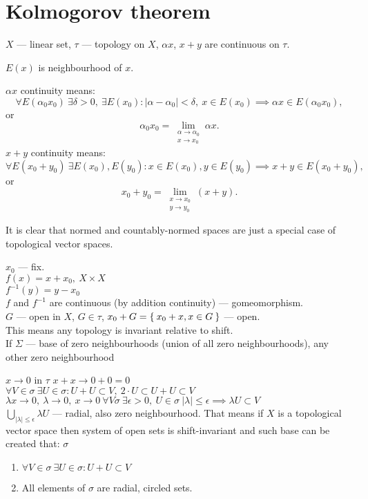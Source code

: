 \section{Kolmogorov theorem}
\begin{defn}
  $X$ --- linear set, $\tau$ --- topology on $X$, $\alpha x$, $x + y$ are
  continuous on $\tau$.

  \noindent $E(x)$ is neighbourhood of $x$.
  
  \noindent $\alpha x$ continuity means:
  \[
    \forall E(\alpha_0 x_0)\ \exists \delta > 0,\ \exists E(x_0) \colon
    |\alpha - \alpha_0| < \delta,\ x \in E(x_0) \implies
    \alpha x \in E(\alpha_0 x_0),
  \]
  or
  \[
    \alpha_0 x_0 = \lim_{\substack{\alpha \to \alpha _0\\ x \to x_0}} \alpha x.
  \]
  \noindent $x + y$ continuity means:
  \[
    \forall E(x_0 + y_0)\ \exists E(x_0), E(y_0) \colon
    x \in E(x_0), y \in E(y_0) \implies x + y \in E(x_0 + y_0),
  \]
  or 
  \[
    x_0 + y_0 = \lim_{\substack{x \to x_0\\ y \to y_0}}(x + y).
  \]
\end{defn}

It is clear that normed and countably-normed spaces are just a special case of
topological vector spaces.

\noindent
$x_0$ --- fix. \\
$f(x) = x + x_0,\ X \times X $ \\
$f^{-1}(y) = y - x_0$ \\
$f$ and $f^{-1}$ are continuous (by addition continuity) --- gomeomorphism. \\
$G$ --- open in $X$, $G \in \tau$, $x_0 + G = \Set{x_0 + x, x \in G}$ --- open. \\
This means any topology is invariant relative to shift. \\
If $\Sigma$ --- base of zero neighbourhoods (union of all zero neighbourhoods), any
other zero neighbourhood 

$x \to 0$ in $\tau$ $x + x \to 0 + 0 = 0$\\
$\forall V \in \sigma\ \exists U \in \sigma \colon U + U \subset V,\ 2 \cdot U
\subset U + U \subset V$ \\
$\lambda x \to 0,\ \lambda \to 0,\ x \to 0\ \forall V \sigma\ \exists \epsilon >
0,\ U \in \sigma\ |\lambda| \leq \epsilon \implies \lambda U \subset V$ \\
$\bigcup\limits_{|\lambda| \leq \epsilon} \lambda U$ --- radial, also zero
neighbourhood. That means if $X$ is a topological vector space then system of open
sets is shift-invariant and such base can be created that:
$\sigma$ 
\begin{enumerate}
\item $\forall V \in \sigma\ \exists U \in \sigma: U + U \subset V$
\item All elements of $\sigma$ are radial, circled sets.
\end{enumerate}

